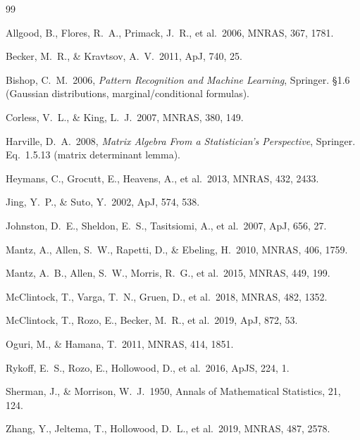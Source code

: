 \documentclass[11pt,a4paper]{article}
\providecommand{\mnras}{MNRAS}
\providecommand{\apj}{ApJ}
\providecommand{\apjs}{ApJS}
\begin{document}
\begin{thebibliography}{99}

Allgood, B., Flores, R.~A., Primack, J.~R., et al.\ 2006, \mnras, 367, 1781.

Becker, M.~R., \& Kravtsov, A.~V.\ 2011, \apj, 740, 25.

Bishop, C.~M.\ 2006, \textit{Pattern Recognition and Machine Learning}, Springer.
\S 1.6 (Gaussian distributions, marginal/conditional formulas).

Corless, V.~L., \& King, L.~J.\ 2007, \mnras, 380, 149.

Harville, D.~A.\ 2008, \textit{Matrix Algebra From a Statistician's
Perspective}, Springer. Eq.~1.5.13 (matrix determinant lemma).

Heymans, C., Grocutt, E., Heavens, A., et al.\ 2013, \mnras, 432, 2433.

Jing, Y.~P., \& Suto, Y.\ 2002, \apj, 574, 538.

Johnston, D.~E., Sheldon, E.~S., Tasitsiomi, A., et al.\ 2007, \apj, 656, 27.

Mantz, A., Allen, S.~W., Rapetti, D., \& Ebeling, H.\ 2010, \mnras, 406, 1759.

Mantz, A.~B., Allen, S.~W., Morris, R.~G., et al.\ 2015, \mnras, 449, 199.

McClintock, T., Varga, T.~N., Gruen, D., et al.\ 2018, \mnras, 482, 1352.

McClintock, T., Rozo, E., Becker, M.~R., et al.\ 2019, \apj, 872, 53.

Oguri, M., \& Hamana, T.\ 2011, \mnras, 414, 1851.

Rykoff, E.~S., Rozo, E., Hollowood, D., et al.\ 2016, \apjs, 224, 1.

Sherman, J., \& Morrison, W.~J.\ 1950, Annals of Mathematical Statistics,
21, 124.

Zhang, Y., Jeltema, T., Hollowood, D.~L., et al.\ 2019, \mnras, 487, 2578.

\end{thebibliography}
\end{document}

